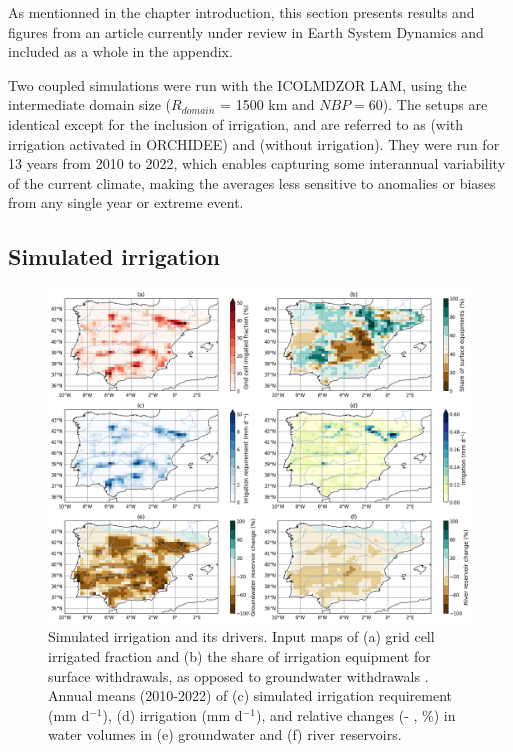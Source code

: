 As mentionned in the chapter introduction, this section presents results and figures from an article currently under review in Earth System Dynamics and included as a whole in the appendix. %

Two coupled simulations were run with the ICOLMDZOR LAM, using the intermediate domain size ($R_{domain}$ = 1500 km and $NBP=60$). The setups are identical except for the inclusion of irrigation, and are referred to as \irr (with irrigation activated in ORCHIDEE) and \noirr (without irrigation). 
They were run for 13 years from 2010 to 2022, which enables capturing some interannual variability of the current climate, making the averages less sensitive to anomalies or biases from any single year or extreme event.

\subsection{Simulated irrigation}
\label{sec:irrig_eval}

\begin{figure}[htbp]
    \centering
    \includegraphics[width=\textwidth]{images/chap4/article/f03.png}
    \caption{Simulated irrigation and its drivers. Input maps of (a) grid cell irrigated fraction \citep[\% , derived from][]{hurtt_harmonization_2020} and (b) the share of irrigation equipment for surface withdrawals, as opposed to groundwater withdrawals \citep[\%, derived from ][]{siebert_groundwater_2010}. Annual means (2010-2022) of (c) simulated irrigation requirement (mm d$^{-1}$), (d) irrigation (mm d$^{-1}$), and relative changes (\irr - \noirr, \%) in water volumes in (e) groundwater and (f) river reservoirs.}
    \label{fig:irrig_maps}
\end{figure}

